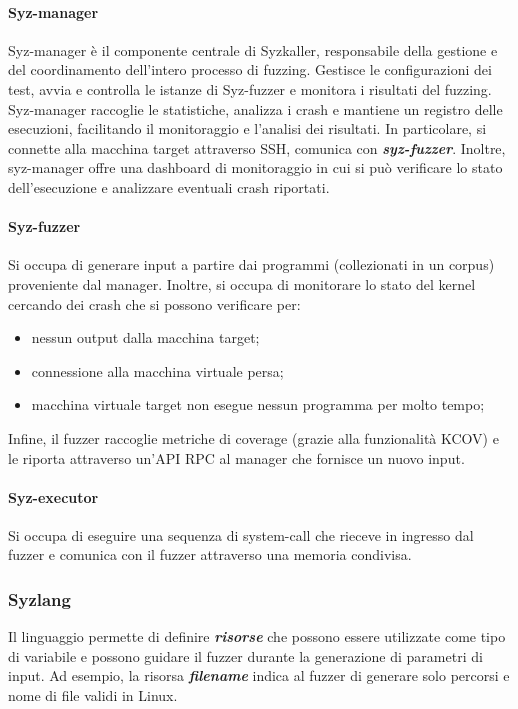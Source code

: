\documentclass{article}
\begin{document}
\paragraph{Syz-manager}Syz-manager è il componente centrale di Syzkaller, responsabile della
gestione e del coordinamento dell'intero processo di fuzzing. Gestisce le configurazioni dei
test, avvia e controlla le istanze di Syz-fuzzer e monitora i risultati del fuzzing. 
Syz-manager raccoglie le statistiche, analizza i crash e mantiene un registro delle 
esecuzioni, facilitando il monitoraggio e l'analisi dei risultati. In particolare, si 
connette alla macchina target attraverso SSH, comunica con \textbf{\textit{syz-fuzzer}}.
Inoltre, syz-manager offre una dashboard di monitoraggio in cui si può verificare lo stato 
dell'esecuzione e analizzare eventuali crash riportati. 

\paragraph{Syz-fuzzer} Si occupa di generare input a partire dai programmi (collezionati 
in un corpus) proveniente dal manager. Inoltre, si occupa di monitorare lo stato del kernel 
cercando dei crash che si possono verificare per:
\begin{itemize}
  \item nessun output dalla macchina target;
  \item connessione alla macchina virtuale persa;
  \item macchina virtuale target non esegue nessun programma per molto tempo;
\end{itemize}
Infine, il fuzzer raccoglie metriche di coverage (grazie alla funzionalità KCOV) e le 
riporta attraverso un'API RPC al manager che fornisce un nuovo input.

\paragraph{Syz-executor} Si occupa di eseguire una sequenza di system-call che rieceve in 
ingresso dal fuzzer e comunica con il fuzzer attraverso una memoria condivisa.

\subsubsection{Syzlang}
Il linguaggio permette di definire \textbf{\textit{risorse}} che possono essere utilizzate 
come tipo di variabile e possono guidare il fuzzer durante la generazione di parametri di 
input. Ad esempio, la risorsa \textbf{\textit{filename}} indica al fuzzer di generare solo 
percorsi e nome di file validi in Linux. 
\end{document}
